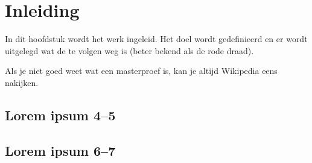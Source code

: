 \chapter{Inleiding}
\label{inleiding}
In dit hoofdstuk wordt het werk ingeleid. Het doel wordt gedefinieerd en er
wordt uitgelegd wat de te volgen weg is (beter bekend als de rode draad).

Als je niet goed weet wat een masterproef is, kan je altijd
Wikipedia\cite{wiki} eens nakijken.

\section{Lorem ipsum 4--5}
\lipsum[4-5]

\section{Lorem ipsum 6--7}
\lipsum[6-7]



